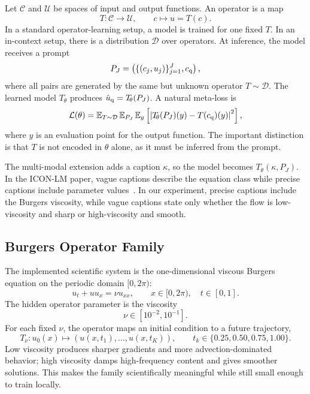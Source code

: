 \documentclass[11pt]{article}
\newcommand{\E}{\mathbb{E}}
\newcommand{\Tth}{T_{\!\theta}}
\begin{document}
Let $\mathcal{C}$ and $\mathcal{U}$ be spaces of input and output functions. An
operator is a map
\begin{equation}
T:\mathcal{C}\to\mathcal{U}, \qquad c\mapsto u=T(c).
\end{equation}
In a standard operator-learning setup, a model is trained for one fixed $T$. In an
in-context setup, there is a distribution $\mathcal{D}$ over operators. At
inference, the model receives a prompt
\begin{equation}
P_J=\left(\{(c_j,u_j)\}_{j=1}^{J},c_{\rm q}\right),
\end{equation}
where all pairs are generated by the same but unknown operator $T\sim\mathcal{D}$.
The learned model $\Tth$ produces $\hat u_{\rm q}=\Tth(P_J)$. A natural meta-loss is
\begin{equation}
\mathcal{L}(\theta)=
\E_{T\sim\mathcal{D}}\,
\E_{P_J}\,
\E_{y}
\left[
  \left|\Tth(P_J)(y)-T(c_{\rm q})(y)\right|^2
\right],
\label{eq:meta_loss}
\end{equation}
where $y$ is an evaluation point for the output function. The important distinction
is that $T$ is not encoded in $\theta$ alone, as it must be inferred from the prompt.

The multi-modal extension adds a caption $\kappa$, so the model becomes
$\Tth(\kappa,P_J)$. In the ICON-LM paper, vague captions describe the equation
class while precise captions include parameter values~\citep{yang2024icon_lm}. In
our experiment, precise captions include the Burgers viscosity, while vague
captions state only whether the flow is low-viscosity and sharp or high-viscosity
and smooth.

\subsection{Burgers Operator Family}

The implemented scientific system is the one-dimensional viscous Burgers equation
on the periodic domain $[0,2\pi)$:
\begin{equation}
u_t + u u_x = \nu u_{xx}, \qquad x\in[0,2\pi),\quad t\in[0,1].
\label{eq:burgers}
\end{equation}
The hidden operator parameter is the viscosity
\begin{equation}
\nu \in [10^{-2},10^{-1}].
\end{equation}
For each fixed $\nu$, the operator maps an initial condition to a future
trajectory,
\begin{equation}
T_{\nu}: u_0(x)\mapsto \left(u(x,t_1),\ldots,u(x,t_K)\right),
\qquad t_k\in\{0.25,0.50,0.75,1.00\}.
\end{equation}
Low viscosity produces sharper gradients and more advection-dominated behavior;
high viscosity damps high-frequency content and gives smoother solutions. This
makes the family scientifically meaningful while still small enough to train
locally.
\end{document}
